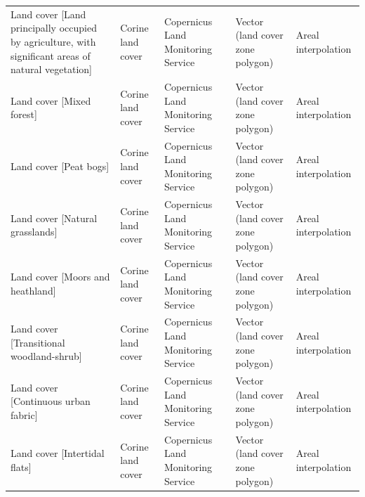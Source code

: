 \documentclass[fleqn,10pt]{wlscirep}
\begin{document}
\begin{longtable}{p{}p{}p{}p{}p{}}
    Land cover [Land principally occupied by agriculture, with significant areas of natural vegetation] &                  Corine land cover  &                                         Copernicus Land Monitoring Service  &  Vector (land cover zone polygon)  &                            Areal interpolation  \\
                                                                                Land cover [Mixed forest] &                  Corine land cover  &                                         Copernicus Land Monitoring Service  &  Vector (land cover zone polygon)  &                            Areal interpolation  \\
                                                                                    Land cover [Peat bogs] &                  Corine land cover  &                                         Copernicus Land Monitoring Service  &  Vector (land cover zone polygon)  &                            Areal interpolation  \\
                                                                        Land cover [Natural grasslands] &                  Corine land cover  &                                         Copernicus Land Monitoring Service  &  Vector (land cover zone polygon)  &                            Areal interpolation  \\
                                                                        Land cover [Moors and heathland] &                  Corine land cover  &                                         Copernicus Land Monitoring Service  &  Vector (land cover zone polygon)  &                            Areal interpolation  \\
                                                                Land cover [Transitional woodland-shrub] &                  Corine land cover  &                                         Copernicus Land Monitoring Service  &  Vector (land cover zone polygon)  &                            Areal interpolation  \\
                                                                    Land cover [Continuous urban fabric] &                  Corine land cover  &                                         Copernicus Land Monitoring Service  &  Vector (land cover zone polygon)  &                            Areal interpolation  \\
                                                                            Land cover [Intertidal flats] &                  Corine land cover  &                                         Copernicus Land Monitoring Service  &  Vector (land cover zone polygon)  &                            Areal interpolation  \\

\end{longtable}
\end{document}
